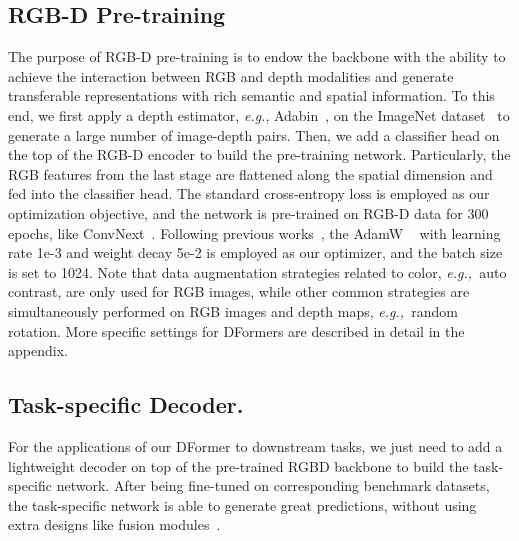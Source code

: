 \documentclass{article}
\def\eg{\emph{e.g.,~}}
\newcommand{\nMethod}{DFormer}
\begin{document}
\subsection{RGB-D Pre-training}
The purpose of RGB-D pre-training is to endow the backbone with the ability to achieve the interaction between RGB and depth modalities and generate transferable representations with rich semantic and spatial information.
To this end, we first apply a depth estimator, \emph{e.g.}, Adabin~\citep{bhat2021adabins},  on the ImageNet dataset~\citep{russakovsky2015imagenet} to generate a large number of image-depth pairs.
Then, we add a classifier head on the top of the RGB-D encoder to build the pre-training network.
Particularly, the RGB features from the last stage are flattened along the spatial dimension and fed into the classifier head.
The standard cross-entropy loss is employed as our optimization objective, and the network is pre-trained on RGB-D data for 300 epochs, like ConvNext~\citep{liu2022convnet}.
Following previous works~\citep{liu2022convnet,guo2022visual}, the AdamW ~\citep{loshchilov2017decoupled}  with learning rate 1e-3 and weight decay 5e-2 is employed as our optimizer, and the batch size is set to 1024.
Note that data augmentation strategies related to color, \eg auto contrast, are only used for RGB images, while other common strategies are simultaneously performed on 
RGB images and depth maps, \eg random rotation. 
More specific settings for \nMethod{}s are described in detail in the appendix.








\subsection{Task-specific Decoder.}
For the applications of our \nMethod{} to downstream tasks, we just need to add a lightweight decoder on top of the pre-trained RGBD backbone to build the task-specific network.
After being fine-tuned on corresponding benchmark datasets, the task-specific network is able to generate great predictions, without using extra designs like fusion modules~\citep{chen2020sa_gate,zhang2022cmx}. 
\end{document}
